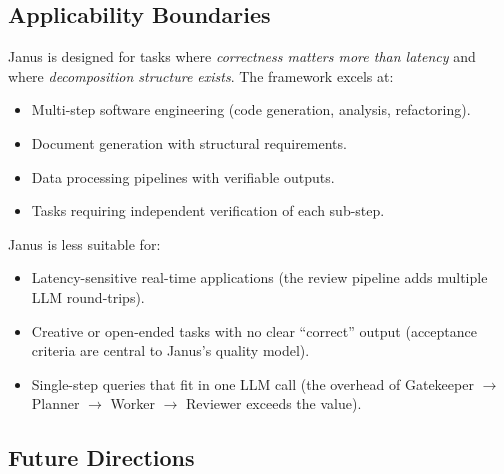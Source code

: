\documentclass[11pt,a4paper]{article}
\begin{document}
\subsection{Applicability Boundaries}

Janus is designed for tasks where \emph{correctness matters more than
latency} and where \emph{decomposition structure exists}. The framework
excels at:

\begin{itemize}[leftmargin=*,itemsep=2pt]
    \item Multi-step software engineering (code generation, analysis,
    refactoring).
    \item Document generation with structural requirements.
    \item Data processing pipelines with verifiable outputs.
    \item Tasks requiring independent verification of each sub-step.
\end{itemize}

Janus is less suitable for:

\begin{itemize}[leftmargin=*,itemsep=2pt]
    \item Latency-sensitive real-time applications (the review pipeline adds
    multiple LLM round-trips).
    \item Creative or open-ended tasks with no clear ``correct'' output
    (acceptance criteria are central to Janus's quality model).
    \item Single-step queries that fit in one LLM call (the overhead of
    Gatekeeper $\rightarrow$ Planner $\rightarrow$ Worker $\rightarrow$
    Reviewer exceeds the value).
\end{itemize}

\subsection{Future Directions}
\end{document}
